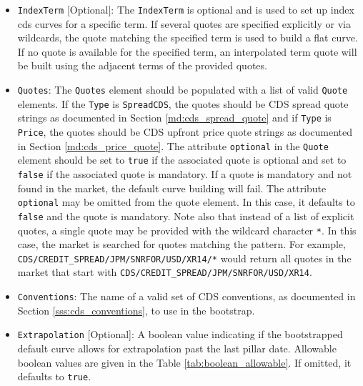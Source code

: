 \begin{itemize}
\item \lstinline!IndexTerm! [Optional]: The \lstinline!IndexTerm! is optional and is used to set up index cds curves for
  a specific term. If several quotes are specified explicitly or via wildcards, the quote matching the specified term is
  used to build a flat curve. If no quote is available for the specified term, an interpolated term quote will be built
  using the adjacent terms of the provided quotes.

\item \lstinline!Quotes!:
The \lstinline!Quotes! element should be populated with a list of valid \lstinline!Quote! elements. If the \lstinline!Type! is \lstinline!SpreadCDS!, the quotes should be CDS spread quote strings as documented in Section \ref{md:cds_spread_quote} and if \lstinline!Type! is \lstinline!Price!, the quotes should be CDS upfront price quote strings as documented in Section \ref{md:cds_price_quote}. The attribute \lstinline!optional! in the \lstinline!Quote! element should be set to \lstinline!true! if the associated quote is optional and set to \lstinline!false! if the associated quote is mandatory. If a quote is mandatory and not found in the market, the default curve building will fail. The attribute \lstinline!optional! may be omitted from the quote element. In this case, it defaults to \lstinline!false! and the quote is mandatory. Note also that instead of a list of explicit quotes, a single quote may be provided with the wildcard character \lstinline!*!. In this case, the market is searched for quotes matching the pattern. For example, \lstinline!CDS/CREDIT_SPREAD/JPM/SNRFOR/USD/XR14/*! would return all quotes in the market that start with \lstinline!CDS/CREDIT_SPREAD/JPM/SNRFOR/USD/XR14!.

\item \lstinline!Conventions!:
The name of a valid set of CDS conventions, as documented in Section \ref{sss:cds_conventions}, to use in the bootstrap.

\item \lstinline!Extrapolation! [Optional]:
A boolean value indicating if the bootstrapped default curve allows for extrapolation past the last pillar date. Allowable boolean values are given in the Table \ref{tab:boolean_allowable}. If omitted, it defaults to \lstinline!true!.


\end{itemize}

